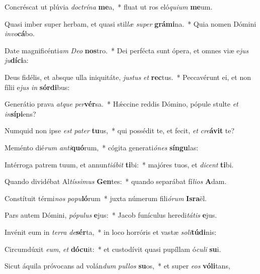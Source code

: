 \item Concréscat ut plúvia \textit{doc}\textit{trí}\textit{na} \textbf{me}a,~* fluat ut ros eló\textit{qui}\textit{um} \textbf{me}um.
\item Quasi imber super herbam, et quasi stil\textit{læ} \textit{su}\textit{per} \textbf{grá}\textbf{mi}na.~* Quia nomen Dómini \textit{in}\textit{vo}\textbf{cá}bo.
\item Date magnificénti\textit{am} \textit{De}\textit{o} \textbf{nos}tro.~* Dei perfécta sunt ópera, et omnes viæ e\textit{jus} \textit{ju}\textbf{dí}\textbf{ci}a:
\item Deus fidélis, et absque ulla iniquitáte, \textit{jus}\textit{tus} \textit{et} \textbf{rec}tus.~* Peccavérunt ei, et non fílii e\textit{jus} \textit{in} \textbf{sór}\textbf{di}bus:
\item Generátio prava \textit{at}\textit{que} \textit{per}\textbf{vér}sa.~* Hǽccine reddis Dómino, pópule stulte \textit{et} \textit{in}\textbf{sí}\textbf{pi}ens?
\item Numquid non ipse \textit{est} \textit{pa}\textit{ter} \textbf{tu}us,~* qui possédit te, et fecit, \textit{et} \textit{cre}\textbf{á}\textbf{vit} te?
\item Meménto dié\textit{rum} \textit{an}\textit{ti}\textbf{quó}rum,~* cógita generati\textit{ó}\textit{nes} \textbf{sín}\textbf{gu}las:
\item Intérroga patrem tuum, et annun\textit{ti}\textit{á}\textit{bit} \textbf{ti}bi:~* majóres tuos, et \textit{di}\textit{cent} \textbf{ti}bi.
\item Quando dividébat Al\textit{tís}\textit{si}\textit{mus} \textbf{Gen}tes:~* quando separábat fí\textit{li}\textit{os} \textbf{A}dam.
\item Constítuit térmi\textit{nos} \textit{po}\textit{pu}\textbf{ló}rum~* juxta númerum fili\textit{ó}\textit{rum} \textbf{Is}\textbf{ra}ël.
\item Pars autem Dómini, \textit{pó}\textit{pu}\textit{lus} \textbf{e}jus:~* Jacob funículus heredi\textit{tá}\textit{tis} \textbf{e}jus.
\item Invénit eum in \textit{ter}\textit{ra} \textit{de}\textbf{sér}ta,~* in loco horróris et vastæ \textit{so}\textit{li}\textbf{tú}\textbf{di}nis:
\item Circumdúxit \textit{e}\textit{um}, \textit{et} \textbf{dó}\textbf{cu}it:~* et custodívit quasi pupíllam ó\textit{cu}\textit{li} \textbf{su}i.
\item Sicut áquila próvocans ad volán\textit{dum} \textit{pul}\textit{los} \textbf{su}os,~* et super \textit{e}\textit{os} \textbf{vó}\textbf{li}tans,
